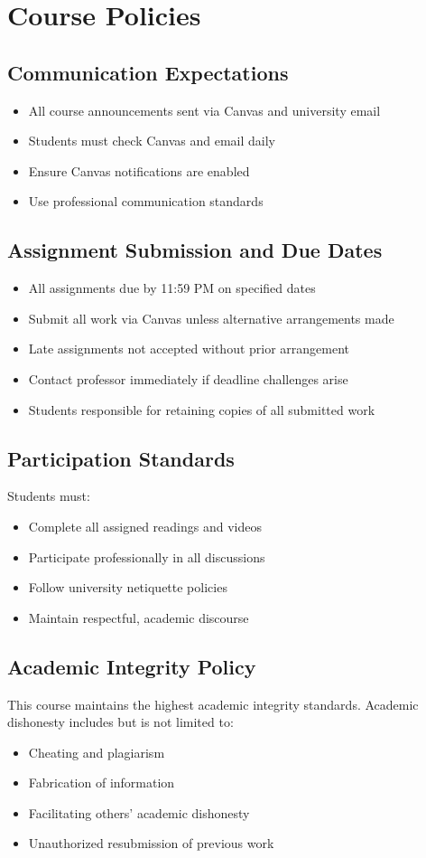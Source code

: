 \documentclass[11pt]{scrartcl} %
\begin{document}
\section{Course Policies}

\subsection{Communication Expectations}
\begin{itemize}
\item All course announcements sent via Canvas and university email
\item Students must check Canvas and email daily
\item Ensure Canvas notifications are enabled
\item Use professional communication standards
\end{itemize}

\subsection{Assignment Submission and Due Dates}
\begin{itemize}
\item All assignments due by 11:59 PM on specified dates
\item Submit all work via Canvas unless alternative arrangements made
\item Late assignments not accepted without prior arrangement
\item Contact professor immediately if deadline challenges arise
\item Students responsible for retaining copies of all submitted work
\end{itemize}

\subsection{Participation Standards}
Students must:
\begin{itemize}
\item Complete all assigned readings and videos
\item Participate professionally in all discussions
\item Follow university netiquette policies
\item Maintain respectful, academic discourse
\end{itemize}

\subsection{Academic Integrity Policy}
This course maintains the highest academic integrity standards. Academic dishonesty includes but is not limited to:
\begin{itemize}
\item Cheating and plagiarism
\item Fabrication of information
\item Facilitating others' academic dishonesty
\item Unauthorized resubmission of previous work
\end{itemize}
\end{document}
